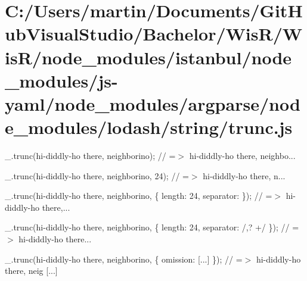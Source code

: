 \hypertarget{_c_1_2_users_2martin_2_documents_2_git_hub_visual_studio_2_bachelor_2_wis_r_2_wis_r_2node_modulecb2ec67dfe39550c38a3882e55dd1834}{}\section{C\+:/\+Users/martin/\+Documents/\+Git\+Hub\+Visual\+Studio/\+Bachelor/\+Wis\+R/\+Wis\+R/node\+\_\+modules/istanbul/node\+\_\+modules/js-\/yaml/node\+\_\+modules/argparse/node\+\_\+modules/lodash/string/trunc.\+js}
\+\_\+.\+trunc(\textquotesingle{}hi-\/diddly-\/ho there, neighborino\textquotesingle{}); // =$>$ \textquotesingle{}hi-\/diddly-\/ho there, neighbo...\textquotesingle{}

\+\_\+.\+trunc(\textquotesingle{}hi-\/diddly-\/ho there, neighborino\textquotesingle{}, 24); // =$>$ \textquotesingle{}hi-\/diddly-\/ho there, n...\textquotesingle{}

\+\_\+.\+trunc(\textquotesingle{}hi-\/diddly-\/ho there, neighborino\textquotesingle{}, \{ \textquotesingle{}length\textquotesingle{}\+: 24, \textquotesingle{}separator\textquotesingle{}\+: \textquotesingle{} \textquotesingle{} \}); // =$>$ \textquotesingle{}hi-\/diddly-\/ho there,...\textquotesingle{}

\+\_\+.\+trunc(\textquotesingle{}hi-\/diddly-\/ho there, neighborino\textquotesingle{}, \{ \textquotesingle{}length\textquotesingle{}\+: 24, \textquotesingle{}separator\textquotesingle{}\+: /,? +/ \}); // =$>$ \textquotesingle{}hi-\/diddly-\/ho there...\textquotesingle{}

\+\_\+.\+trunc(\textquotesingle{}hi-\/diddly-\/ho there, neighborino\textquotesingle{}, \{ \textquotesingle{}omission\textquotesingle{}\+: \textquotesingle{} \mbox{[}...\mbox{]}\textquotesingle{} \}); // =$>$ \textquotesingle{}hi-\/diddly-\/ho there, neig \mbox{[}...\mbox{]}\textquotesingle{}


